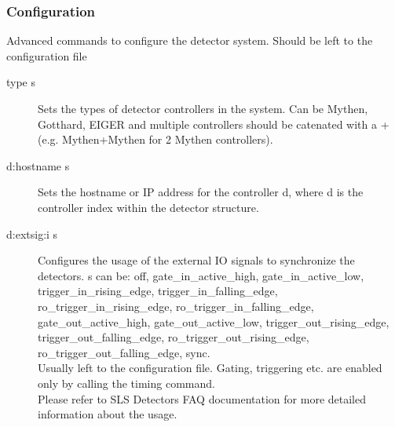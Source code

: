 \documentclass{article}
\newcommand{\E}{EIGER\xspace}
\begin{document}
\subsubsection{Configuration}
Advanced commands to configure the detector system. Should be left to the configuration file
\begin{description}
\item[type s] Sets the types of detector controllers in the system. Can be Mythen, Gotthard, \E and multiple controllers should be catenated with a + (e.g. Mythen+Mythen for 2 Mythen controllers).
\item[d:hostname s] Sets the hostname or IP address for the controller d, where d is the controller index within the detector structure.    
\item[d:extsig:i s] Configures the usage of the external IO signals to synchronize the detectors. s can be:  off, gate\_in\_active\_high, gate\_in\_active\_low, trigger\_in\_rising\_edge,
                         trigger\_in\_falling\_edge,
                         ro\_trigger\_in\_rising\_edge,
                         ro\_trigger\_in\_falling\_edge,
                         gate\_out\_active\_high,
                         gate\_out\_active\_low,
                         trigger\_out\_rising\_edge,
                         trigger\_out\_falling\_edge,
                         ro\_trigger\_out\_rising\_edge,
                         ro\_trigger\_out\_falling\_edge, sync. \\Usually left to the configuration file. Gating, triggering etc. are enabled only by calling the timing command. \\
Please refer to SLS Detectors FAQ documentation for more detailed information about the usage.
      

\end{description}
\end{document}
